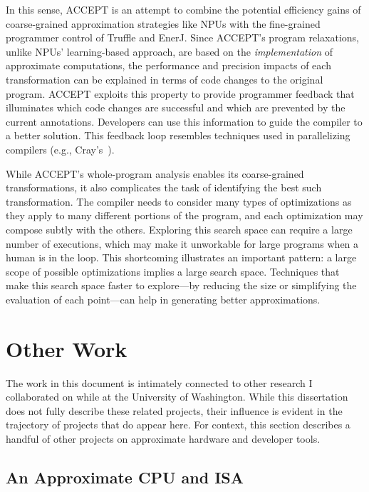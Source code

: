 In this sense, ACCEPT is an attempt to combine the potential efficiency gains
of coarse-grained approximation strategies like NPUs with the fine-grained
programmer control of Truffle and EnerJ. Since ACCEPT's program relaxations,
unlike NPUs' learning-based approach, are based on the \emph{implementation}
of approximate computations, the performance and precision impacts of each
transformation can be explained in terms of code changes to the original
program. ACCEPT exploits this property to provide programmer feedback that
illuminates which code changes are successful and which are prevented by the
current annotations. Developers can use this information to guide the compiler
to a better solution. This feedback loop resembles techniques used in
parallelizing compilers (e.g., Cray's~\cite{canal}).

While ACCEPT's whole-program analysis enables its coarse-grained
transformations, it also complicates the task of identifying the best such
transformation. The compiler needs to consider many types of optimizations as
they apply to many different portions of the program, and each optimization
may compose subtly with the others. Exploring this search space can require
a large number of executions, which may make it unworkable for large programs
when a human is in the loop. This shortcoming illustrates an important
pattern: a large scope of possible optimizations implies a large search space.
Techniques that make this search space faster to explore---by reducing the
size or simplifying the evaluation of each point---can help in generating
better approximations.



\section{Other Work}

The work in this document is intimately connected to other research I
collaborated on while at the University of Washington.
While this dissertation does not fully describe these related projects, their
influence is evident in the trajectory of projects that do appear here.
For context, this section describes a handful of other projects on approximate
hardware and developer tools.

\subsection{An Approximate CPU and ISA}

